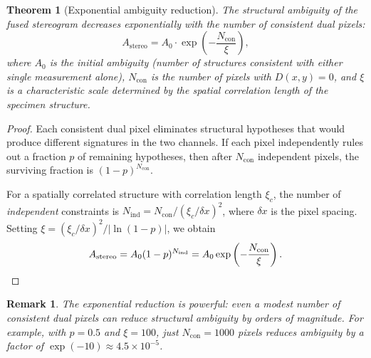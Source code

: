 \documentclass[11pt,twocolumn,a4paper]{article}
\newtheorem{theorem}{Theorem}
\newtheorem{remark}{Remark}
\begin{document}
\begin{theorem}[Exponential ambiguity reduction]\label{thm:ambiguity}
The structural ambiguity of the fused stereogram decreases exponentially with the number of consistent dual pixels:
\begin{equation}\label{eq:ambiguity}
A_{\mathrm{stereo}} = A_0 \cdot \exp\left(-\frac{N_{\mathrm{con}}}{\xi}\right),
\end{equation}
where $A_0$ is the initial ambiguity (number of structures consistent with either single measurement alone), $N_{\mathrm{con}}$ is the number of pixels with $D(x,y) = 0$, and $\xi$ is a characteristic scale determined by the spatial correlation length of the specimen structure.
\end{theorem}
\begin{proof}
Each consistent dual pixel eliminates structural hypotheses that would produce different signatures in the two channels.
If each pixel independently rules out a fraction $p$ of remaining hypotheses, then after $N_{\mathrm{con}}$ independent pixels, the surviving fraction is $(1-p)^{N_{\mathrm{con}}}$.

For a spatially correlated structure with correlation length $\xi_c$, the number of \emph{independent} constraints is $N_{\mathrm{ind}} = N_{\mathrm{con}} / (\xi_c / \delta x)^2$, where $\delta x$ is the pixel spacing.
Setting $\xi = (\xi_c/\delta x)^2 / |\ln(1-p)|$, we obtain
\begin{equation}
A_{\mathrm{stereo}} = A_0 (1-p)^{N_{\mathrm{ind}}} = A_0 \exp\left(-\frac{N_{\mathrm{con}}}{\xi}\right). \qedhere
\end{equation}
\end{proof}

\begin{remark}
The exponential reduction is powerful: even a modest number of consistent dual pixels can reduce structural ambiguity by orders of magnitude.
For example, with $p = 0.5$ and $\xi = 100$, just $N_{\mathrm{con}} = 1000$ pixels reduces ambiguity by a factor of $\exp(-10) \approx 4.5 \times 10^{-5}$.
\end{remark}

\end{document}
